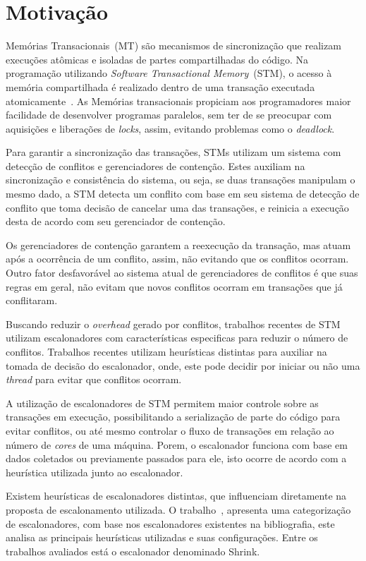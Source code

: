 \documentclass[diss-proposta,nocipinfo]{texufpel}
\begin{document}
\chapter{Motivação}

Memórias Transacionais~(MT) são mecanismos de sincronização que realizam execuções atômicas e isoladas de partes compartilhadas do código. Na programação utilizando \emph{Software Transactional Memory}~(STM), o acesso à memória compartilhada é realizado dentro de uma transação executada atomicamente~\cite{teixeira15}. As Memórias transacionais propiciam aos programadores maior facilidade de desenvolver programas paralelos, sem ter de se preocupar com aquisições e liberações de \emph{locks}, assim, evitando problemas como o \emph{deadlock}.

Para garantir a sincronização das transações, STMs utilizam um sistema com detecção de conflitos e gerenciadores de contenção. Estes auxiliam na sincronização e consistência do sistema, ou seja, se duas transações manipulam o mesmo dado, a STM detecta um conflito com base em seu sistema de detecção de conflito que toma decisão de cancelar uma das transações, e reinicia a execução desta de acordo com seu gerenciador de contenção.

Os gerenciadores de contenção garantem a reexecução da transação, mas atuam após a ocorrência de um conflito, assim, não evitando que os conflitos ocorram. Outro fator desfavorável ao sistema atual de gerenciadores de conflitos é que suas regras em geral, não evitam que novos conflitos ocorram em transações que já conflitaram.

Buscando reduzir o \emph{overhead} gerado por conflitos, trabalhos recentes de STM utilizam escalonadores com características especificas para reduzir o número de conflitos. Trabalhos recentes utilizam heurísticas distintas para auxiliar na tomada de decisão do escalonador, onde, este pode decidir por iniciar ou não uma \emph{thread} para evitar que conflitos ocorram.

A utilização de escalonadores de STM permitem maior controle sobre as transações em execução, possibilitando a serialização de parte do código para evitar conflitos, ou até mesmo controlar o fluxo de transações em relação ao número de \emph{cores} de uma máquina. Porem, o escalonador funciona com base em dados coletados ou previamente passados para ele, isto ocorre de acordo com a heurística utilizada junto ao escalonador.

Existem heurísticas de escalonadores distintas, que influenciam diretamente na proposta de escalonamento utilizada. O trabalho~\cite{sanzo17}, apresenta uma categorização de escalonadores, com base nos escalonadores existentes na bibliografia, este analisa as principais heurísticas utilizadas e suas configurações. Entre os trabalhos avaliados está o escalonador denominado Shrink.
\end{document}
